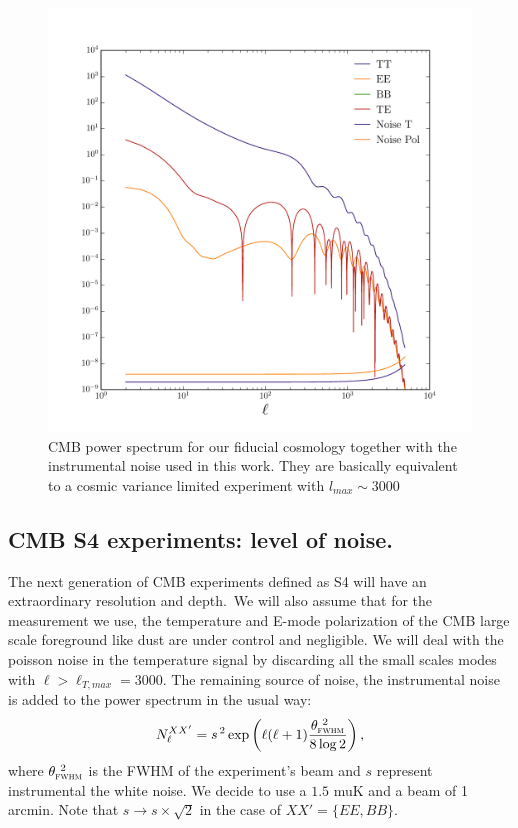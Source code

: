 \documentclass[aps,prl,preprint,groupedaddress]{revtex4-1}
\begin{document}
\begin{figure}[htbp]
\begin{center}
\includegraphics[scale=0.6]{PS_with_noise.pdf}
\caption{CMB power spectrum for our fiducial cosmology together with the instrumental noise used in this work. They are basically equivalent to a cosmic variance limited experiment with $l_{max}\sim 3000$}
\label{fig:cmb-cl-noise}
\end{center}
\end{figure}


\subsection{CMB S4 experiments: level of noise.\label{sec:noise}}

The next generation of CMB experiments defined as S4 will have an extraordinary resolution and depth.\
We will also assume that for the measurement we use, the temperature and E-mode polarization of the CMB large scale foreground like dust are under control and negligible. We will deal with the poisson noise in the temperature signal by discarding all the small scales modes with $\ell>\ell_{T,max}=3000$.
The remaining source of noise, the instrumental noise is added to the power spectrum in the usual way:
 \begin{equation}
 	\centering
		N^{ XX' }_\ell = s^{\, 2} \exp \left(\ell(\ell+1) \frac{\theta^{\ 2}_{\textsc{fwhm}}}{8\log2}\right),
	\label{eq:beamnoise}
\end{equation}
where $\theta^{\ 2}_{\textsc{fwhm}}$ is the FWHM of the experiment's beam and $s$ represent instrumental the white noise.
We decide to use a $1.5$ muK and a beam of 1 arcmin.
Note that  $s \rightarrow s\times \sqrt{2}$ in the case of $ XX' = \{ EE, BB \}$.
\end{document}
